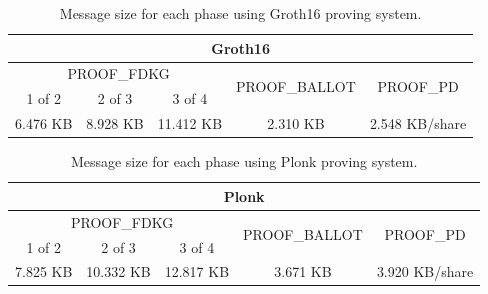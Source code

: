 \documentclass{article}
\begin{document}
\begin{table}
\centering
\label{table:groth16-size}
\caption{Message size for each phase using Groth16 proving system.}
\begin{tabular}{|c|c|c|c|c|}
    \hline
    \multicolumn{5}{|c|}{Groth16} \\
    \hline
    \multicolumn{3}{|c|}{\textrm{PROOF}_\textrm{FDKG}} & \multirow{2}{*}{\textrm{PROOF}_\textrm{BALLOT}} & \multirow{2}{*}{\textrm{PROOF}_\textrm{PD}} \\
    \cline{1-3}
    1 of 2 & 2 of 3 & 3 of 4 & & \\
    \hline
    6.476 KB& 8.928 KB & 11.412 KB & 2.310 KB & 2.548 KB/share\\
    \hline
\end{tabular}
\end{table}

\begin{table}
\centering
\label{table:plonk-size}
\caption{Message size for each phase using Plonk proving system.}
\begin{tabular}{|c|c|c|c|c|}
    \hline
    \multicolumn{5}{|c|}{Plonk} \\
    \hline
    \multicolumn{3}{|c|}{\textrm{PROOF}_\textrm{FDKG}} & \multirow{2}{*}{\textrm{PROOF}_\textrm{BALLOT}} & \multirow{2}{*}{\textrm{PROOF}_\textrm{PD}} \\
    \cline{1-3}
    1 of 2 & 2 of 3 & 3 of 4 & & \\
    \hline
    7.825 KB& 10.332 KB & 12.817 KB & 3.671 KB & 3.920 KB/share\\
    \hline
\end{tabular}
\end{table}
\end{document}
